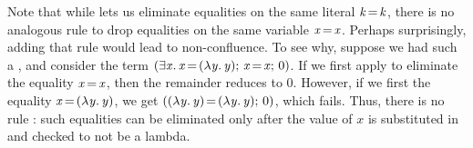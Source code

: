 \documentclass[acmsmall]{acmart}
\newcommand{\Varid}[1]{\mathit{#1}}
\begin{document}
%
Note that while  lets us eliminate equalities on the same literal $\ensuremath{\Varid{k}\hspace{-0.14em}=\hspace{-0.14em}\Varid{k}}$,
there is no analogous  rule to drop equalities on the same variable $\ensuremath{\Varid{x}\hspace{-0.14em}=\hspace{-0.14em}\Varid{x}}$.
Perhaps surprisingly, adding that rule would lead to non-confluence.
%
To see why, suppose we had such a , and consider the term \ensuremath{(\exists\Varid{x}.\,\Varid{x}\hspace{-0.14em}=\hspace{-0.14em}(\lambda\Varid{y}.\,\Varid{y});\,\Varid{x}\hspace{-0.14em}=\hspace{-0.14em}\Varid{x};\,\mathrm{0})}.
%
If we first apply  to eliminate the equality $\ensuremath{\Varid{x}\hspace{-0.14em}=\hspace{-0.14em}\Varid{x}}$, then the remainder
reduces to \ensuremath{\mathrm{0}}.
However, if we first  the equality \ensuremath{\Varid{x}\hspace{-0.14em}=\hspace{-0.14em}(\lambda\Varid{y}.\,\Varid{y})},
we get \ensuremath{((\lambda\Varid{y}.\,\Varid{y})\hspace{-0.14em}=\hspace{-0.14em}(\lambda\Varid{y}.\,\Varid{y});\,\mathrm{0})}, which fails.
%
Thus, there is no rule : such equalities can be eliminated only
after the value of \ensuremath{\Varid{x}} is substituted in and checked to not be a lambda.
\end{document}
